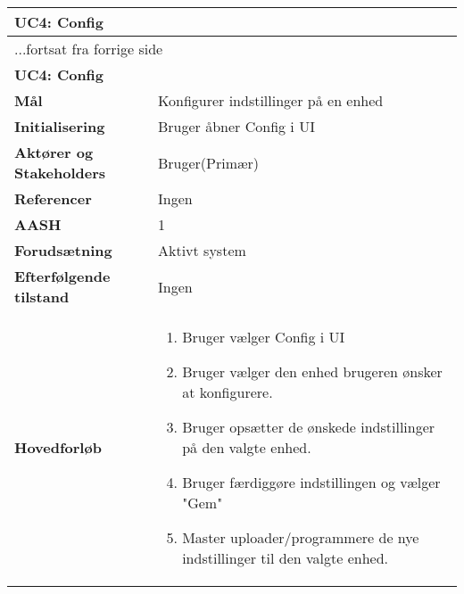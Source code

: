 \begin{center} \centering \label{UC4}
	\begin{longtable}{|p{5cm}|p{9cm}|}  %
	\hline
		\multicolumn{2}{|l|}{\textbf{UC4: Config}} \\\hline %
		\endfirsthead
		
		\multicolumn{2}{l}{...fortsat fra forrige side} \\ \hline %
		\multicolumn{2}{|l|}{\textbf{UC4: Config}} \\\hline %
		\endhead	
		
		\textbf{Mål}								&Konfigurer indstillinger på en enhed			\\\hline
		\textbf{Initialisering}					&Bruger åbner Config i UI		\\\hline
		\textbf{Aktører og Stakeholders}			&Bruger(Primær)					\\\hline
		\textbf{Referencer}						&Ingen							\\\hline
		\textbf{AASH}							&1								\\\hline
		\textbf{Forudsætning}					&Aktivt system					\\\hline
		\textbf{Efterfølgende tilstand}			&Ingen							\\\hline
		\textbf{Hovedforløb}					
			&\begin{enumerate}
	
				\item Bruger vælger Config i UI
				
				\item Bruger vælger den enhed brugeren ønsker at konfigurere.
				
				\item Bruger opsætter de ønskede indstillinger på den valgte enhed.
				
				\item Bruger færdiggøre indstillingen og vælger "Gem"
				
				\item Master uploader/programmere de nye indstillinger til den valgte enhed. 
	
			\end{enumerate}\\\hline
	\end{longtable}
\end{center}

